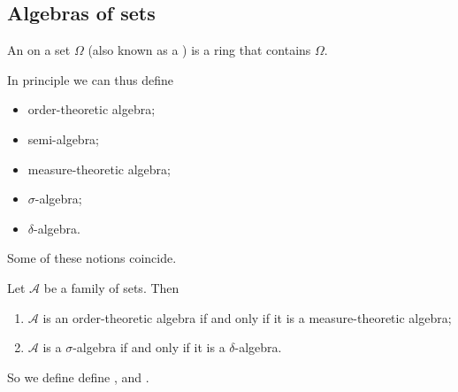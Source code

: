 \subsection{Algebras of sets}
\begin{definition}
An  on a set $\Omega$ (also known as a ) is a ring that contains $\Omega$.
\end{definition}

In principle we can thus define
\begin{itemize}
\item order-theoretic algebra;
\item semi-algebra;
\item measure-theoretic algebra;
\item $\sigma$-algebra;
\item $\delta$-algebra.
\end{itemize}

Some of these notions coincide.

\begin{lemma}
Let $\mathcal{A}$ be a family of sets. Then
\begin{enumerate}
\item $\mathcal{A}$ is an order-theoretic algebra \textup{if and only if} it is a measure-theoretic algebra;
\item $\mathcal{A}$ is a $\sigma$-algebra \textup{if and only if} it is a $\delta$-algebra.
\end{enumerate}
\end{lemma}

So we define define ,  and .

